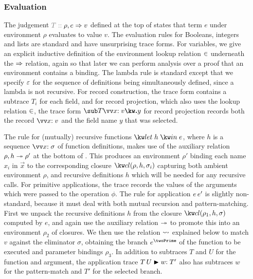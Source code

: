 

\subsubsection{Evaluation}
\label{sec:core-language:eval}

The judgement $\explVal{T}{\rho, e \evalR v}$ defined at the top of  states that term $e$ under environment $\rho$ evaluates to value $v$. The evaluation rules for Booleans, integers and lists are standard and have unsurprising trace forms. For variables, we give an explicit inductive definition of the environment lookup relation $\in$ underneath the $\Rightarrow$ relation, again so that later we can perform analysis over a proof that an environment contains a binding. The lambda rule is standard except that we specify $\varepsilon$ for the sequence of definitions being simultaneously defined, since a lambda is not recursive. For record construction, the trace form contains a subtrace $T_i$ for each field, and for record projection, which also uses the lookup relation $\in$, the trace form $\trRecProj{T}{\vec{\bind{x}{v}}}{y}$ for record projection records both the record $\vec{\bind{x}{v}}$ and the field name $y$ that was selected.

The rule for (mutually) recursive functions $\exLetRecMutual{h}{e}$, where $h$ is a sequence $\vec{\bind{x}{\sigma}}$ of function definitions, makes use of the auxiliary relation $\rho, h \twoheadrightarrow \rho'$ at the bottom of . This produces an environment $\rho'$ binding each name $x_i$ in $\vec{x}$ to the corresponding closure $\exClosure{\rho}{h}{\sigma_i}$ capturing both ambient environment $\rho$, and recursive definitions $h$ which will be needed for any recursive calls. For primitive applications, the trace records the values of the arguments which were passed to the operation $\phi$. The rule for application ${e}\,{e'}$ is slightly non-standard, because it must deal with both mutual recursion and pattern-matching. First we unpack the recursive definitions $h$ from the closure $\exClosure{\rho_1}{h}{\sigma}$ computed by $e$, and again use the auxiliary relation $\twoheadrightarrow$ to promote this into an environment $\rho_2$ of closures. We then use the relation $\rightsquigarrow$ explained below to match $v$ against the eliminator $\sigma$, obtaining the branch $e^\twoPrime$ of the function to be executed and parameter bindings $\rho_3$. In addition to subtraces $T$ and $U$ for the function and argument, the application trace ${T}\,{U} \mathrel{\blacktriangleright} {w{:}\;T'}$ also has subtraces $w$ for the pattern-match and $T'$ for the selected branch.

